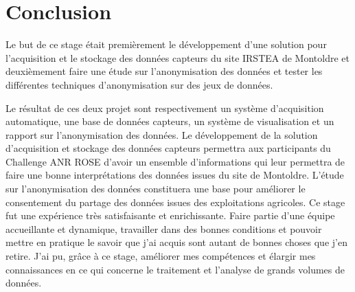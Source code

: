 \section{Conclusion}
Le but de ce stage était premièrement le développement d'une solution pour l'acquisition et le stockage des données capteurs du site IRSTEA de Montoldre et deuxièmement faire une étude sur l'anonymisation des données et tester les différentes techniques d'anonymisation sur des jeux de données.

Le résultat de ces deux projet sont respectivement un système d'acquisition automatique, une base de données capteurs, un système de visualisation et un rapport sur l'anonymisation des données. Le développement de la solution d'acquisition et stockage des données capteurs permettra aux participants du Challenge ANR ROSE d'avoir un ensemble d'informations qui leur permettra de faire une bonne interprétations des données issues du site de Montoldre. L'étude sur l'anonymisation des données constituera une base pour améliorer le consentement du partage des données issues des exploitations agricoles.
Ce stage fut une expérience très satisfaisante et enrichissante. Faire partie d'une équipe accueillante et dynamique, travailler dans des bonnes conditions et pouvoir mettre en pratique le savoir que j'ai acquis sont autant de bonnes choses que j'en retire.
J'ai pu, grâce à ce stage, améliorer mes compétences et élargir mes connaissances en ce qui concerne le traitement et l'analyse de grands volumes de  données.
